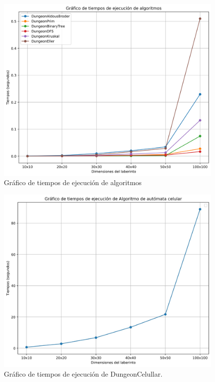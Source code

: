 \begin{figure}
    \centering  
    \includegraphics[width=\textwidth]{img/TimeGraph.png}  
    \caption{Gráfico de tiempos de ejecución de algoritmos}  
    \label{fig:TiemposAlgoritmos}
\end{figure}

\begin{figure}
    \centering  
    \includegraphics[width=\textwidth]{img/CelularTiempos.jpeg}  
    \caption{Gráfico de tiempos de ejecución de DungeonCelullar.}  
    \label{fig:CelularTiempos}
\end{figure}

